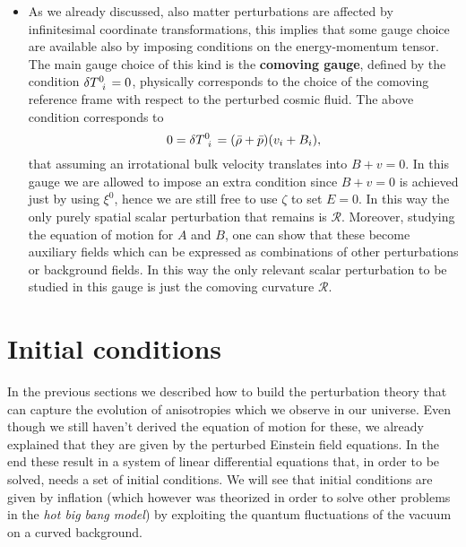 \begin{itemize}
    \item
    As we already discussed, also matter perturbations are affected by infinitesimal coordinate transformations, this implies that some gauge choice are available also by imposing conditions on the energy-momentum tensor. The main gauge choice of this kind is the \textbf{comoving gauge}, defined by the condition $\delta \tensor{T}{^0_i}=0$, physically corresponds to the choice of the comoving reference frame with respect to the perturbed cosmic fluid. The above condition corresponds to 
    $$0=\delta \tensor{T}{^0_i}=(\bar\rho+\bar p)(v_i+B_i),$$
    that assuming an irrotational bulk velocity translates into $B+v=0$. In this gauge we are allowed to impose an extra condition since $B+v=0$ is achieved just by using $\xi^0$, hence we are still free to use $\zeta$ to set $E=0$. In this way the only purely spatial scalar perturbation that remains is $\mathcal{R}$. Moreover, studying the equation of motion for $A$ and $B$, one can show that these become auxiliary fields which can be expressed as combinations of other perturbations or background fields. In this way the only relevant scalar perturbation to be studied in this gauge is just the comoving curvature $\mathcal{R}$.
\end{itemize} 
\section{Initial conditions}
\label{sec:initial_condition}
In the previous sections we described how to build the perturbation theory that can capture the evolution of anisotropies which we observe in our universe. Even though we still haven't derived the equation of motion for these, we already explained that they are given by the perturbed Einstein field equations. In the end these result in a system of linear differential equations that, in order to be solved, needs a set of initial conditions. We will see that initial conditions are given by inflation (which however was theorized in order to solve other problems in the \emph{hot big bang model}) by exploiting the quantum fluctuations of the vacuum on a curved background.

